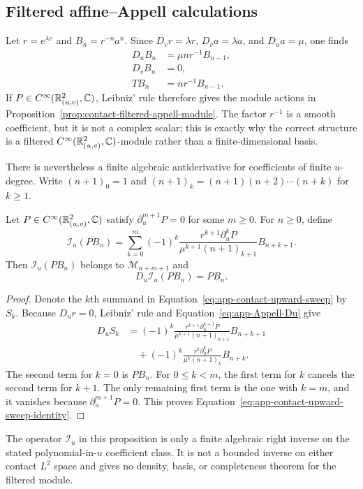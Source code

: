 \subsection{Filtered affine--Appell calculations}

Let $r=e^{\lambda v}$ and $B_n=r^{-n}a^n$.  Since
$D_vr=\lambda r$, $D_va=\lambda a$, and $D_ua=\mu$, one finds
\begin{align}
 D_uB_n&=\mu n r^{-1}B_{n-1},\label{eq:app-Appell-Du}\\
 D_vB_n&=0,\label{eq:app-Appell-Dv}\\
 TB_n&=nr^{-1}B_{n-1}.
 \label{eq:app-Appell-T}
\end{align}
If $P\in C^\infty(\mathbb{R}^2_{(u,v)},\mathbb{C})$, Leibniz' rule therefore gives the
module actions in Proposition~\ref{prop:contact-filtered-appell-module}.
The factor $r^{-1}$ is a smooth coefficient, but it is not a complex scalar;
this is exactly why the correct structure is a filtered
$C^\infty(\mathbb{R}^2_{(u,v)},\mathbb{C})$-module rather than a finite-dimensional basis.

There is nevertheless a finite algebraic antiderivative for coefficients of
finite $u$-degree.  Write
$(n+1)_0=1$ and
$(n+1)_k=(n+1)(n+2)\cdots(n+k)$ for $k\ge1$.

\begin{proposition}\label{prop:app-contact-upward-sweep}
Let $P\in C^\infty(\mathbb{R}^2_{(u,v)},\mathbb{C})$ satisfy
$\partial_u^{m+1}P=0$ for some $m\ge0$.  For $n\ge0$, define
\begin{equation}\label{eq:app-contact-upward-sweep}
 \mathcal I_u(PB_n)
 =\sum_{k=0}^{m}(-1)^k
  \frac{r^{k+1}\partial_u^kP}
       {\mu^{k+1}(n+1)_{k+1}}B_{n+k+1}.
\end{equation}
Then $\mathcal I_u(PB_n)$ belongs to $\mathcal M_{n+m+1}$ and
\begin{equation}\label{eq:app-contact-upward-sweep-identity}
 D_u\mathcal I_u(PB_n)=PB_n.
\end{equation}
\end{proposition}

\begin{proof}
Denote the $k$th summand in
Equation~\eqref{eq:app-contact-upward-sweep} by $S_k$.  Because $D_ur=0$,
Leibniz' rule and Equation~\eqref{eq:app-Appell-Du} give
\begin{align*}
 D_uS_k
 &=(-1)^k
   \frac{r^{k+1}\partial_u^{k+1}P}
        {\mu^{k+1}(n+1)_{k+1}}B_{n+k+1}\\
 &\quad+(-1)^k
   \frac{r^k\partial_u^kP}
        {\mu^k(n+1)_k}B_{n+k}.
\end{align*}
The second term for $k=0$ is $PB_n$.  For
$0\le k<m$, the first term for $k$ cancels the second term for $k+1$.
The only remaining first term is the one with $k=m$, and it vanishes because
$\partial_u^{m+1}P=0$.  This proves
Equation~\eqref{eq:app-contact-upward-sweep-identity}.
\end{proof}

The operator $\mathcal I_u$ in this proposition is only a finite algebraic
right inverse on the stated polynomial-in-$u$ coefficient class.  It is not a
bounded inverse on either contact $L^2$ space and gives no density, basis, or
completeness theorem for the filtered module.
